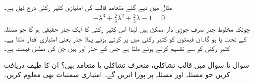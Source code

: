 مثال  میں دیے گئے متعامد قالب کی امتیازی کثیر رکنی درج ذیل ہے۔
\begin{align*}
-\lambda^3+\frac{2}{3}\lambda^2+\frac{2}{3}\lambda-1=0
\end{align*} 
چونکہ مخلوط جذر صرف جوڑی دار ممکن ہیں لہٰذا اس کثیر رکنی کا ایک جذر حقیقی ہو گا جو مسئلہ  کے تحت  یا  ہو گا۔ان قیمتوں کو کثیر رکنی میں پر کرتے ہوئے پہلا جذر یعنی امتیازی اقدار  ملتا ہے۔کثیر رکنی کو  سے تقسیم کرتے ہوئے  ملتا ہے جس کے جذر   اور  ہیں جن کی مطلق قیمت  ہے۔

سوال  تا سوال  میں قالب تشاکلی، منحرف تشاکلی یا متعامد ہیں؟ ان کا طیف  دریافت کریں جو مسئلہ  اور مسئلہ  پر پورا اتریں گے۔ امتیازی سمتیات بھی معلوم کریں۔

